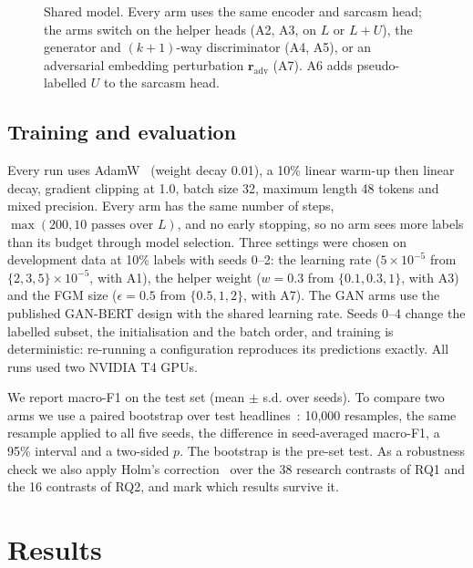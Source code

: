 \documentclass[conference]{IEEEtran}
\begin{document}
\begin{figure}[t]
\centering
\resizebox{\columnwidth}{!}{}
\caption{Shared model. Every arm uses the same encoder and sarcasm head; the arms switch on the helper heads (A2, A3, on $L$ or $L{+}U$), the generator and $(k{+}1)$-way discriminator (A4, A5), or an adversarial embedding perturbation $\mathbf{r}_{\mathrm{adv}}$ (A7). A6 adds pseudo-labelled $U$ to the sarcasm head.}
\label{fig:arch}
\end{figure}

\subsection{Training and evaluation}
Every run uses AdamW~\cite{loshchilov2019decoupled} (weight decay 0.01), a 10\% linear warm-up then linear decay, gradient clipping at 1.0, batch size 32, maximum length 48 tokens and mixed precision. Every arm has the same number of steps, $\max(200, 10 \text{ passes over } L)$, and no early stopping, so no arm sees more labels than its budget through model selection. Three settings were chosen on development data at 10\% labels with seeds 0--2: the learning rate ($5{\times}10^{-5}$ from $\{2,3,5\}{\times}10^{-5}$, with A1), the helper weight ($w{=}0.3$ from $\{0.1, 0.3, 1\}$, with A3) and the FGM size ($\epsilon{=}0.5$ from $\{0.5,1,2\}$, with A7). The GAN arms use the published GAN-BERT design with the shared learning rate. Seeds 0--4 change the labelled subset, the initialisation and the batch order, and training is deterministic: re-running a configuration reproduces its predictions exactly. All runs used two NVIDIA T4 GPUs.

We report macro-F1 on the test set (mean $\pm$ s.d. over seeds). To compare two arms we use a paired bootstrap over test headlines~\cite{berg2012empirical}: 10,000 resamples, the same resample applied to all five seeds, the difference in seed-averaged macro-F1, a 95\% interval and a two-sided $p$. The bootstrap is the pre-set test. As a robustness check we also apply Holm's correction~\cite{holm1979simple} over the 38 research contrasts of RQ1 and the 16 contrasts of RQ2, and mark which results survive it.

\section{Results}

\begin{table}[t]
\centering
\caption{Test macro-F1 (\%, mean $\pm$ s.d. over 5 seeds) by label budget. $^{\dagger}$: trains on the unlabelled pool $U$ (empty at 100\%). Bold: highest mean per budget (at 1\%, A2, A6 and A7 are within 0.05 points). --: not run.}
\label{tab:main}
\footnotesize
\setlength{\tabcolsep}{5pt}

\end{table}
\end{document}

